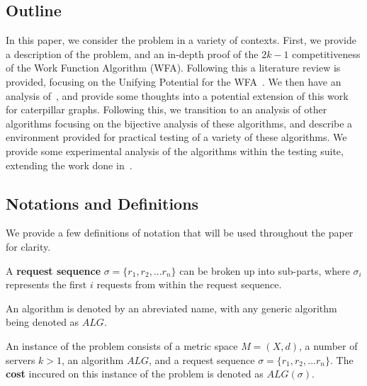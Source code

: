 \subsection{Outline}
\label{sec:out}
In this paper, we consider the \KS problem in a variety of contexts. First, we provide a description of the \KS problem, and an in-depth proof of the $2k-1$ competitiveness of the Work Function Algorithm (WFA). Following this a literature review is provided, focusing on the Unifying Potential for the WFA~\cite{unifyingPotential2021}. We then have an analysis of~\cite{unifyingPotential2021}, and provide some thoughts into a potential extension of this work for caterpillar graphs. Following this, we transition to an analysis of other algorithms focusing on the bijective analysis of these algorithms, and describe a \CC environment provided for practical testing of a variety of these algorithms. We provide some experimental analysis of the algorithms within the testing suite, extending the work done in~\cite{independantStudy2023}.

\subsection{Notations and Definitions}

We provide a few definitions of notation that will be used throughout the paper for clarity.

\begin{definition}
    A \textbf{request sequence} $\sigma = \{ r_1, r_2, ... r_n\}$ can be broken up into sub-parts, where $\sigma_i$ represents the first $i$ requests from within the request sequence.
\end{definition}

\begin{definition}
    An algorithm is denoted by an abreviated name, with any generic algorithm being denoted as $ALG$.
\end{definition}

\begin{definition}
    An instance of the \KS problem consists of a metric space $M = (X,d)$, a number of servers $k >1$, an algorithm $ALG$, and a request sequence $\sigma = \{ r_1, r_2, ... r_n\}$. The \textbf{cost} inccured on this instance of the \KS problem is denoted as $ALG(\sigma)$.
\end{definition}

